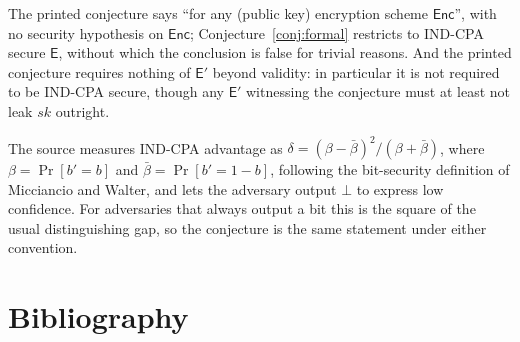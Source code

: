 \documentclass{aicr-conjecture}
\newcommand{\Enc}{\mathsf{Enc}}
\begin{document}
\begin{remark}\label{rem:reading}
The printed conjecture says ``for any (public key) encryption scheme
$\Enc$'', with no security hypothesis on $\Enc$;
Conjecture~\ref{conj:formal} restricts to IND-CPA secure $\mathsf{E}$,
without which the conclusion is false for trivial reasons. And the
printed conjecture requires nothing of $\mathsf{E}'$ beyond validity:
in particular it is not required to be IND-CPA secure, though any
$\mathsf{E}'$ witnessing the conjecture must at least not leak $sk$
outright.
\end{remark}

\begin{remark}\label{rem:advantage}
The source measures IND-CPA advantage as $\delta = (\beta -
\bar\beta)^{2}/(\beta + \bar\beta)$, where $\beta = \Pr[b' = b]$ and
$\bar\beta = \Pr[b' = 1-b]$, following the bit-security definition of
Micciancio and Walter, and lets the adversary output $\bot$ to express
low confidence. For adversaries that always output a bit this is the
square of the usual distinguishing gap, so the conjecture is the same
statement under either convention.
\end{remark}

\section{Bibliography}
\end{document}
